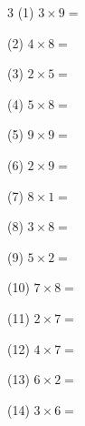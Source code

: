 \documentclass[a4paper, 11pt]{ltjsarticle}
\begin{document}
\hfill

\vspace*{2ex}

\vspace*{5ex}

\begin{multicols*}{3}
\noindent (1) \quad $3 \times 9 =$
\vspace*{\fill}

\noindent (2) \quad $4 \times 8 =$
\vspace*{\fill}

\noindent (3) \quad $2 \times 5 =$
\vspace*{\fill}

\noindent (4) \quad $5 \times 8 =$
\vspace*{\fill}

\noindent (5) \quad $9 \times 9 =$
\vspace*{\fill}

\noindent (6) \quad $2 \times 9 =$
\vspace*{\fill}

\noindent (7) \quad $8 \times 1 =$
\vspace*{\fill}

\noindent (8) \quad $3 \times 8 =$
\vspace*{\fill}

\noindent (9) \quad $5 \times 2 =$
\vspace*{\fill}

\noindent (10) \quad $7 \times 8 =$
\vspace*{\fill}

\noindent (11) \quad $2 \times 7 =$
\vspace*{\fill}

\noindent (12) \quad $4 \times 7 =$
\vspace*{\fill}
\columnbreak

\noindent (13) \quad $6 \times 2 =$
\vspace*{\fill}

\noindent (14) \quad $3 \times 6 =$
\vspace*{\fill}


\end{multicols*}
\end{document}
